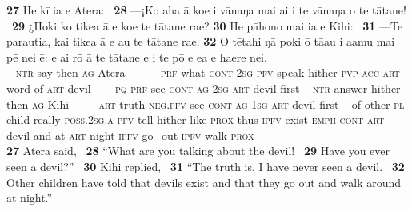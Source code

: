 {\bigskip\gll
\textbf{\textup{27}} He kī ia e {\ꞌ}Atera: ~\textbf{\textup{28}} —¡Ko aha {\ꞌ}ā koe i vānaŋa mai ai i te vānaŋa o te tātane! ~\textbf{\textup{29}} ¿Hoki ko tike{\ꞌ}a {\ꞌ}ā e koe te tātane ra{\ꞌ}e? \textbf{\textup{30}} He pāhono mai ia e Kihi: ~\textbf{\textup{31}} —Te parauti{\ꞌ}a, kai tike{\ꞌ}a {\ꞌ}ā e au te tātane ra{\ꞌ}e. \textbf{\textup{32}} O tētahi ŋā poki {\ꞌ}ō tā{\ꞌ}au i {\ꞌ}a{\ꞌ}amu mai pē nei ē: e ai rō {\ꞌ}ā te tātane {\ꞌ}e {\ꞌ}i te pō e e{\ꞌ}a e ha{\ꞌ}ere nei.\\
~ \textsc{ntr} say then \textsc{ag} Atera ~ ~~~~\textsc{prf} what \textsc{cont} \textsc{2sg} \textsc{pfv} speak hither \textsc{pvp} \textsc{acc} \textsc{art} word of \textsc{art} devil ~ ~~\textsc{pq} \textsc{prf} see \textsc{cont} \textsc{ag} \textsc{2sg} \textsc{art} devil first  ~ \textsc{ntr} answer hither then \textsc{ag} Kihi ~ ~~~\textsc{art} truth \textsc{neg.pfv} see \textsc{cont} \textsc{ag} \textsc{1sg} \textsc{art} devil first ~ of other \textsc{pl} child really \textsc{poss.2sg.a} \textsc{pfv} tell hither like \textsc{prox} thus \textsc{ipfv} exist \textsc{emph} \textsc{cont} \textsc{art} devil and at \textsc{art} night \textsc{ipfv} go\_out \textsc{ipfv} walk \textsc{prox}\\

\medskip\glt
\textbf{\textup{27}} Atera said, ~\textbf{\textup{28}} “What are you talking about the devil! ~\textbf{\textup{29}} Have you ever seen a devil?” ~\textbf{\textup{30}} Kihi replied, ~\textbf{\textup{31}} “The truth is, I have never seen a devil. ~\textbf{\textup{32}} Other children have told that devils exist and that they go out and walk around at night.”

~

}
